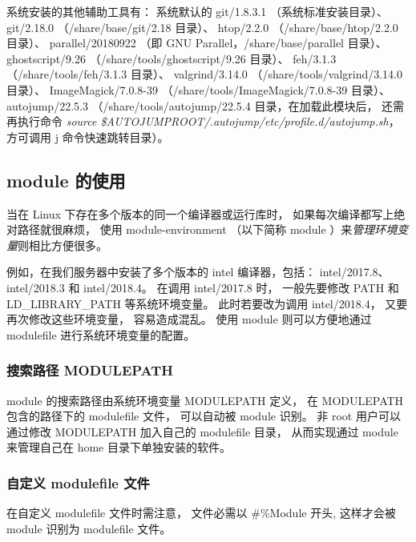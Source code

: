\documentclass[UTF8]{ctexart}
\newcommand{\mynote}[1]{\colorbox{gray!35}{#1}}
\begin{document}
系统安装的其他辅助工具有：\newline
系统默认的 git/1.8.3.1 （系统标准安装目录）、\newline
git/2.18.0 （/share/base/git/2.18 目录）、\newline
htop/2.2.0 （/share/base/htop/2.2.0 目录）、\newline
parallel/20180922 （即 GNU Parallel，/share/base/parallel 目录）、\newline
ghostscript/9.26 （/share/tools/ghostscript/9.26 目录）、\newline
feh/3.1.3 （/share/tools/feh/3.1.3 目录）、\newline
valgrind/3.14.0 （/share/tools/valgrind/3.14.0 目录）、\newline
ImageMagick/7.0.8-39 （/share/tools/ImageMagick/7.0.8-39 目录）、\newline
autojump/22.5.3 （/share/tools/autojump/22.5.4 目录，在加载此模块后，
还需再执行命令 {\em source \$AUTOJUMPROOT/.autojump/etc/profile.d/autojump.sh}，
方可调用 j 命令快速跳转目录）。

\subsection{module 的使用}
当在 Linux 下存在多个版本的同一个编译器或运行库时，
如果每次编译都写上绝对路径就很麻烦，
使用 module-environment （以下简称 module ）来{\em 管理环境变量}则相比方便很多。

例如，在我们服务器中安装了多个版本的 intel 编译器，包括：
intel/2017.8、intel/2018.3 和 intel/2018.4。
在调用 intel/2017.8 时，
一般先要修改 PATH 和 LD\_LIBRARY\_PATH 等系统环境变量。
此时若要改为调用 intel/2018.4，
又要再次修改这些环境变量，
容易造成混乱。
使用 module 则可以方便地通过 modulefile 进行系统环境变量的配置。

\subsubsection{搜索路径 MODULEPATH}
module 的搜索路径由系统环境变量 MODULEPATH 定义，
在 MODULEPATH 包含的路径下的 modulefile 文件，
可以自动被 module 识别。
非 root 用户可以通过修改 MODULEPATH 加入自己的 modulefile 目录，
从而实现通过 module 来管理自己在 home 目录下单独安装的软件。

\subsubsection{自定义 modulefile 文件}
在自定义 modulefile  文件时需注意，
文件必需以 \mynote{\#\%Module} 开头,
这样才会被 module 识别为 modulefile 文件。
\end{document}
